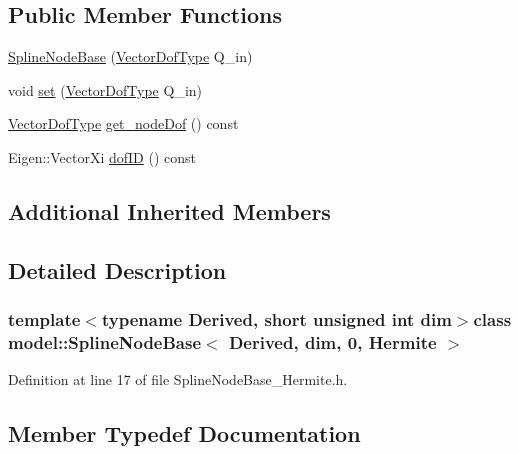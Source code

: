 \subsection*{Public Member Functions}
\begin{DoxyCompactItemize}
\item 
\hyperlink{classmodel_1_1_spline_node_base_3_01_derived_00_01dim_00_010_00_01_hermite_01_4_a5fec1f8045ca7f64bb9b2e3cdaf03dec}{Spline\+Node\+Base} (\hyperlink{classmodel_1_1_spline_node_base_3_01_derived_00_01dim_00_010_00_01_hermite_01_4_a80bc9eddf53243e072ed19e68412d939}{Vector\+Dof\+Type} Q\+\_\+in)
\item 
void \hyperlink{classmodel_1_1_spline_node_base_3_01_derived_00_01dim_00_010_00_01_hermite_01_4_afee352791e31605387baff504d4d1ba9}{set} (\hyperlink{classmodel_1_1_spline_node_base_3_01_derived_00_01dim_00_010_00_01_hermite_01_4_a80bc9eddf53243e072ed19e68412d939}{Vector\+Dof\+Type} Q\+\_\+in)
\item 
\hyperlink{classmodel_1_1_spline_node_base_3_01_derived_00_01dim_00_010_00_01_hermite_01_4_a80bc9eddf53243e072ed19e68412d939}{Vector\+Dof\+Type} \hyperlink{classmodel_1_1_spline_node_base_3_01_derived_00_01dim_00_010_00_01_hermite_01_4_abf3ee7b52c96efad7a7f02e2147ed6d8}{get\+\_\+node\+Dof} () const 
\item 
Eigen\+::\+Vector\+Xi \hyperlink{classmodel_1_1_spline_node_base_3_01_derived_00_01dim_00_010_00_01_hermite_01_4_a1cdf58b51f9d604ec3ab7811a6624b54}{dof\+I\+D} () const 
\end{DoxyCompactItemize}
\subsection*{Additional Inherited Members}


\subsection{Detailed Description}
\subsubsection*{template$<$typename Derived, short unsigned int dim$>$class model\+::\+Spline\+Node\+Base$<$ Derived, dim, 0, Hermite $>$}



Definition at line 17 of file Spline\+Node\+Base\+\_\+\+Hermite.\+h.



\subsection{Member Typedef Documentation}
\hypertarget{classmodel_1_1_spline_node_base_3_01_derived_00_01dim_00_010_00_01_hermite_01_4_af7807f7969fece6222d6376110a1c904}{}
